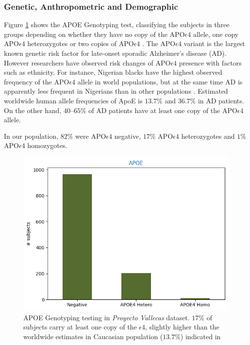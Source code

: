 \documentclass[11pt]{article}
\theoremstyle{definition}
\theoremstyle{remark}
\begin{document}
\subsubsection{Genetic, Anthropometric and Demographic}
\label{ssse:ant}
Figure \ref{fig:apoe} shows the APOE Genotyping test, classifying the subjects in three groups depending on whether they have no copy of the APO$\epsilon4$ allele, one copy APO$\epsilon4$ heterozygotes or two copies of APO$\epsilon4$ \cite{farrer1997effects}. The APO$\epsilon4$ variant is the largest known genetic risk factor for late-onset sporadic Alzheimer's disease (AD). However researchers have observed risk changes of APO$\epsilon4$ presence with factors such as ethnicity. For instance, Nigerian blacks have the highest observed frequency of the APO$\epsilon4$ allele in world populations, but at the same time AD is apparently less frequent in Nigerians than in other populations \cite{sepehrnia1989genetic}.
Estimated worldwide human allele frequencies of ApoE is $13.7\%$ and $36.7\%$ in AD patients. On the other hand, $40–65\%$ of AD patients have at least one copy of the APO$\epsilon4$ allele.

In our population, $82\%$ were APO$\epsilon4$ negative, $17\%$ APO$\epsilon4$ heterozygotes and $1\%$ APO$\epsilon4$ homozygotes. 

\begin{figure}[H]
        \centering
        \includegraphics[keepaspectratio, width=0.6\linewidth]{figures/Fig_apoe}
        \caption{APOE Genotyping testing in \emph{Proyecto Vallecas} dataset. $17\%$ of subjects carry at least one copy of the $\epsilon4$, slightly higher than the worldwide estimates in Caucasian population ($13.7\%$) indicated in \cite{farrer1997effects}} 
        \label{fig:apoe}
\end{figure}
\end{document}
